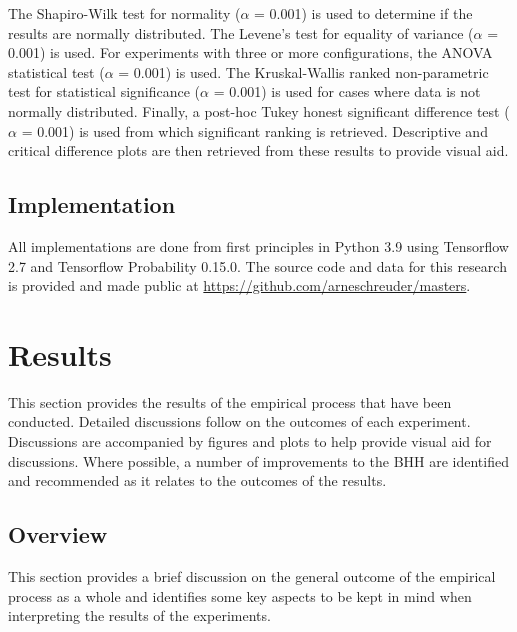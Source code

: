 \documentclass[preprint,review,12pt]{elsarticle}
\begin{document}
The Shapiro-Wilk test for normality \citep{ref:shapiro:1965} ($\alpha$ = 0.001) is used to determine if the results are normally distributed. The Levene's test for equality of variance \citep{ref:levene:1961} ($\alpha$ = 0.001) is used. For experiments with three or more configurations, the \acs{ANOVA} statistical test \citep{ref:fisher:1921} ($\alpha$ = 0.001) is used. The Kruskal-Wallis ranked non-parametric test \citep{ref:kruskal:1952} for statistical significance ($\alpha$ = 0.001) is used for cases where data is not normally distributed. Finally, a post-hoc Tukey honest significant difference test \citep{ref:tukey:1949} ($\alpha$ = 0.001) is used from which significant ranking is retrieved. Descriptive and critical difference plots are then retrieved from these results to provide visual aid.

\subsection{Implementation}\label{sec:methodology:implementation}

All implementations are done from first principles in Python 3.9 using Tensorflow 2.7 and Tensorflow Probability 0.15.0. The source code and data for this research is provided and made public at \url{https://github.com/arneschreuder/masters}.



\section{Results}
\label{sec:results}

This section provides the results of the empirical process that have been conducted. Detailed discussions follow on the outcomes of each experiment. Discussions are accompanied by figures and plots to help provide visual aid for discussions. Where possible, a number of improvements to the \acs{BHH} are identified and recommended as it relates to the outcomes of the results.

\subsection{Overview}\label{sec:results:overview}

This section provides a brief discussion on the general outcome of the empirical process as a whole and identifies some key aspects to be kept in mind when interpreting the results of the experiments.
\end{document}
